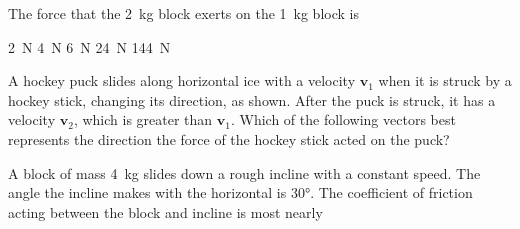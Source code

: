 \documentclass{../../../oss-ap12ibhl}
\begin{document}
\begin{questions}
  \question The force that the \SI{2}{\kilo\gram} block exerts on the
  \SI{1}{\kilo\gram} block is
  \begin{choices}
    \choice\SI{2}{\newton}
    \choice\SI{4}{\newton}
    \choice\SI{6}{\newton}
    \choice\SI{24}{\newton}
    \choice\SI{144}{\newton}
  \end{choices}
  \label{3blks2}
    
  \question A hockey puck slides along horizontal ice with a velocity $\bm{v}_1$
  when it is struck by a hockey stick, changing its direction, as shown. After
  the puck is struck, it has a velocity $\bm{v}_2$, which is greater than
  $\bm{v}_1$. Which of the following vectors best represents the direction the
  force of the hockey stick acted on the puck?
  \begin{center}
  \end{center}
  \begin{oneparchoices}
    \choice{\Huge $\uparrow$}
    \choice{\Huge $\leftarrow$}
    \choice{\Huge $\rightarrow$}
    \choice{\Huge $\nwarrow$}
    \choice{\Huge $\nearrow$}
  \end{oneparchoices}
  \vspace{.2in}
  
  \question A block of mass \SI{4}{\kilo\gram} slides down a rough incline with
  a constant speed. The angle the incline makes with the horizontal is
  \ang{30}. The coefficient of friction acting between the block and incline
  is most nearly

  \begin{minipage}{.3\linewidth}
  \end{minipage}
  \begin{minipage}{.4\linewidth}
    \begin{choices}
    \end{choices}
  \end{minipage}
    

\end{questions}
\end{document}
